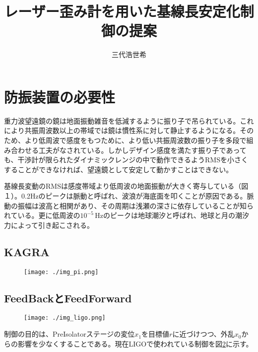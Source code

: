 \documentclass[a4paper,12pt]{jsarticle}
\title{レーザー歪み計を用いた基線長安定化制御の提案}
\author{三代浩世希}
\begin{document}
\setcounter{tocdepth}{3}
\maketitle
\abstract{}
\tableofcontents

\section{防振装置の必要性}
重力波望遠鏡の鏡は地面振動雑音を低減するように振り子で吊られている。これにより共振周波数以上の帯域では鏡は慣性系に対して静止するようになる。そのため、より低周波で感度をもつために、より低い共振周波数の振り子を多段で組み合わせる工夫がなされている。しかしデザイン感度を満たす振り子であっても、干渉計が限られたダイナミックレンジの中で動作できるようRMSを小さくすることができなければ、望遠鏡として安定して動かすことはできない。

基線長変動のRMSは感度帯域より低周波の地面振動が大きく寄与している（図１）。0.2Hzのピークは脈動と呼ばれ、波浪が海底面を叩くことが原因である。脈動の振幅は波高と相関があり、その周期は浅瀬の深さに依存していることが知られている\cite{kedar2008origin}。更に低周波の$10^{-5}\, \mathrm{Hz}$のピークは地球潮汐と呼ばれ、地球と月の潮汐力によって引き起こされる。



\subsection{KAGRA}


\begin{figure}[H]
  \begin{center}
    \texttt{[image: ./img\_pi.png]}
  \end{center}
  \caption{}\label{img:img_pi}
\end{figure}

\subsection{FeedBackとFeedForward}

\begin{figure}[H]
  \begin{center}
    \texttt{[image: ./img\_ligo.png]}
  \end{center}
  \caption{}\label{img:img_ligo}
\end{figure}

制御の目的は、PreIsolatorステージの変位$x_1$を目標値$r$に近づけつつ、外乱$x_0$からの影響を少なくすることである。現在LIGOで使われている制御\cite{matichard2015seismic}を図\ref{img:img_ligo}に示す。
\end{document}
